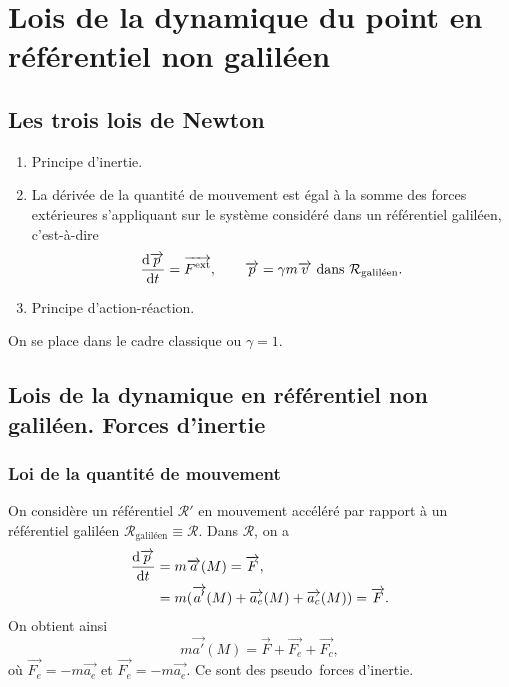 \section[Lois de la dynamique du point]{Lois de la dynamique du point en référentiel non galiléen}

    \subsection{Les trois lois de Newton}

        \begin{enumerate}[label=\arabic*.]
            \item Principe d'inertie.
            \item La dérivée de la quantité de mouvement est égal à la somme des forces extérieures s'appliquant sur le système considéré dans un référentiel galiléen, c'est-à-dire
            \begin{equation}
                \frac{\mathrm{d}\protect\overrightarrow{{p}}}{\mathrm{d} t}=\protect\overrightarrow{{F^{\text{ext}}}},\qquad \protect\overrightarrow{{p}}=\gamma m\protect\overrightarrow{{v}}\text{ dans }\mathcal{R}_{\text{galiléen}}.
            \end{equation}
            \item Principe d'action-réaction.
        \end{enumerate}
        On se place dans le cadre classique ou $\gamma=1$.
    
    \subsection{Lois de la dynamique en référentiel non galiléen. Forces d'inertie}
        \subsubsection{Loi de la quantité de mouvement}

            On considère un référentiel $\mathcal{R}'$ en mouvement accéléré par rapport à un référentiel galiléen $\mathcal{R}_{\text{galiléen}}\equiv\mathcal{R}$. Dans $\mathcal{R}$, on a 
            \begin{align}
                \frac{\mathrm{d}\protect\overrightarrow{{p}}}{\mathrm{d} t}
                &=
                m\protect\overrightarrow{{a}}(M)=\protect\overrightarrow{{F}},\\
                &=m(\protect\overrightarrow{{a'}}(M)+\protect\overrightarrow{{a_e}}(M)+\protect\overrightarrow{{a_c}}(M))=\protect\overrightarrow{{F}}.
            \end{align}
            On obtient ainsi
            \begin{equation}
                m\vec{a'}(M)=\vec{F}+\vec{F_e}+\vec{F_c},
            \end{equation}
            où $\vec{F_e}=-m\vec{a_e}$ et $\vec{F_e}=-m\vec{a_e}$. Ce sont des \og pseudo\fg~forces d'inertie.

